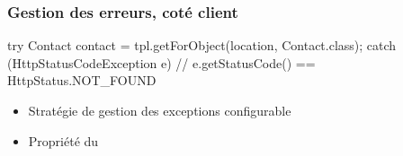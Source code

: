\begin{frame}[fragile]
 \frametitle{Gestion des erreurs, coté client}
 
 \begin{javacode}
try {
  Contact contact = tpl.getForObject(location, Contact.class);
} catch (HttpStatusCodeException e) {
  // e.getStatusCode() == HttpStatus.NOT\_FOUND
}
 \end{javacode}
 
 \begin{itemize}
  \item Stratégie de gestion des exceptions configurable
  \item Propriété  du 
 \end{itemize}

\end{frame}